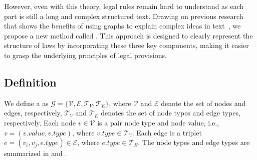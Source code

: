 However, even with this theory, legal rules remain hard to understand as each part is still a long and complex structured text. Drawing on previous research that shows the benefits of using graphs to explain complex ideas in text~\cite{Greco2023BringingOI,wang-etal-2022-d2gclf}, we propose a new method called \lawgraph{}. This approach is designed to clearly represent the structure of laws by incorporating these three key components, making it easier to grasp the underlying principles of legal provisions.



\subsection{\lawgraph{} Definition} \label{dd}
We define a \lawgraph{} as $\mathcal{G}=\{\mathcal{V}, \mathcal{E}, \mathcal{T}_V, \mathcal{T}_E\}$, where $\mathcal{V}$ and $\mathcal{E}$ denote the set of nodes and edges, respectively, $\mathcal{T}_V$ and $\mathcal{T}_E$ denotes the set of node types and edge types, respectively. Each node $v\in \mathcal{V}$ is a pair node type and node value, i.e., $v=(v.value, v.type)$, where $v.type\in \mathcal{T}_V$. Each edge is a triplet $e=(v_i, v_j, e.type)\in \mathcal{E}$, where $e.type\in \mathcal{T}_E$. The node types and edge types are summarized in  and . 





